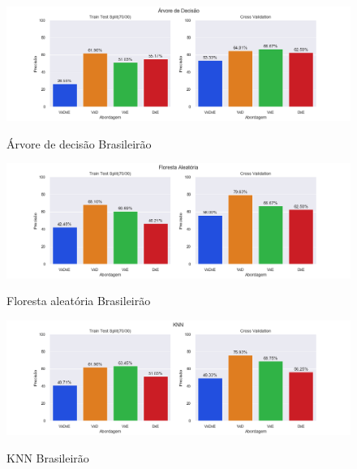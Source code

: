 \begin{figure}[htbp]
  \begin{center}
  \includegraphics[width=1.05\linewidth]{imagens/resultados/arvore_decisao_br.png}\\
  \end{center}
  \caption[Árvore de decisão Brasileirão]{Árvore de decisão Brasileirão}
  \label{fig:logo}
\end{figure}

\begin{figure}[htbp]
  \begin{center}
  \includegraphics[width=1.05\linewidth]{imagens/resultados/floresta_aleatoria_br.png}\\
  \end{center}
  \caption[Floresta aleatória Brasileirão]{Floresta aleatória Brasileirão}
  \label{fig:logo}
\end{figure}

\begin{figure}[htbp]
  \begin{center}
  \includegraphics[width=1.05\linewidth]{imagens/resultados/knn_br.png}\\
  \end{center}
  \caption[KNN Brasileirão]{KNN Brasileirão}
  \label{fig:logo}
\end{figure}


